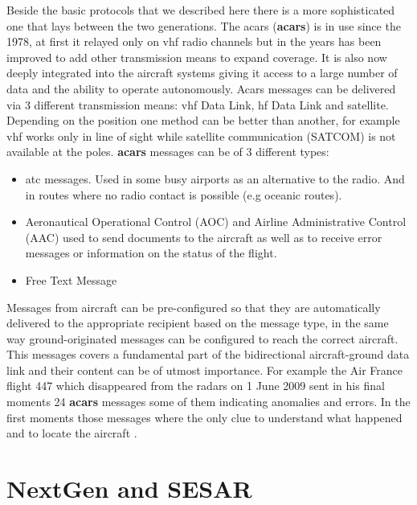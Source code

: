 \documentclass[../main.tex]{subfiles}
\begin{document}
Beside the basic protocols that we described here there is a more sophisticated one that lays between the two generations.
The \acrlong{acars} (\textbf{\acrshort{acars}}) is in use since the 1978, at first it relayed only on \acrshort{vhf} radio channels but in the years has been improved to add other transmission means to expand coverage. It is also now deeply integrated into the aircraft systems giving it access to a large number of data and the ability to operate autonomously. Acars messages can be delivered via 3 different transmission means: \acrshort{vhf} Data Link, \acrshort{hf} Data Link and satellite. Depending on the position one method can be better than another, for example \acrshort{vhf} works only in line of sight while satellite communication (SATCOM) is not available at the poles. \textbf{\acrshort{acars}} messages can be of 3 different types:
\begin{itemize}
  \item \acrlong{atc} messages. Used in some busy airports as an alternative to the radio. And in routes where no radio contact is possible (e.g oceanic routes).
  \item Aeronautical Operational Control (AOC) and Airline Administrative Control (AAC) used to send documents to the aircraft as well as to receive error messages or information on the status of the flight.
  \item Free Text Message
\end{itemize}
Messages from aircraft can be pre-configured so that they are automatically delivered to the appropriate recipient based on the message type, in the same way ground-originated messages can be configured to reach the correct aircraft. This messages covers a fundamental part of the bidirectional aircraft-ground data link and their content can be of utmost importance.
For example the Air France flight 447 which disappeared from the radars on 1 June 2009 sent in his final moments 24 \textbf{\acrshort{acars}} messages some of them indicating anomalies and errors. In the first moments those messages where the only clue to understand what happened and to locate the aircraft \cite{af447}.
\bigskip

\section{NextGen and SESAR}
\end{document}
